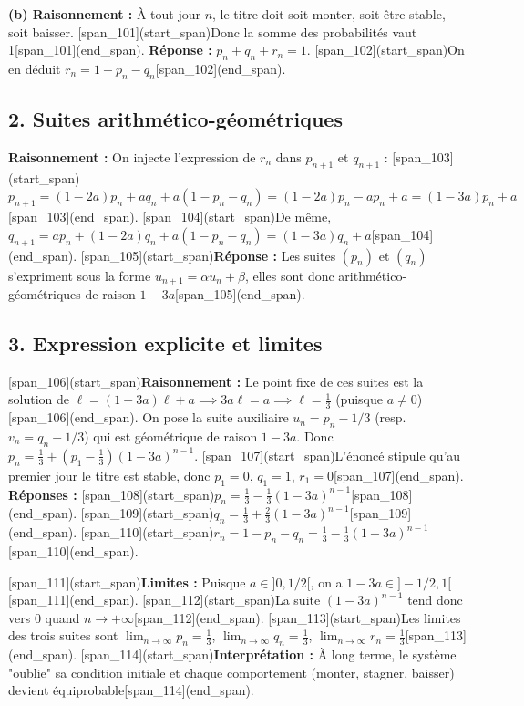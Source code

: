 \documentclass[11pt,a4paper]{article}
\begin{document}
\textbf{(b) Raisonnement :} À tout jour $n$, le titre doit soit monter, soit être stable, soit baisser. [span_101](start_span)Donc la somme des probabilités vaut 1[span_101](end_span).
\textbf{Réponse :} $p_n + q_n + r_n = 1$. [span_102](start_span)On en déduit $r_n = 1 - p_n - q_n$[span_102](end_span).

\subsection*{2. Suites arithmético-géométriques}
\textbf{Raisonnement :} On injecte l'expression de $r_n$ dans $p_{n+1}$ et $q_{n+1}$ :
[span_103](start_span)$p_{n+1} = (1-2a)p_n + a q_n + a(1 - p_n - q_n) = (1-2a)p_n - a p_n + a = (1-3a)p_n + a$[span_103](end_span).
[span_104](start_span)De même, $q_{n+1} = a p_n + (1-2a)q_n + a(1 - p_n - q_n) = (1-3a)q_n + a$[span_104](end_span).
[span_105](start_span)\textbf{Réponse :} Les suites $(p_n)$ et $(q_n)$ s'expriment sous la forme $u_{n+1} = \alpha u_n + \beta$, elles sont donc arithmético-géométriques de raison $1-3a$[span_105](end_span).

\subsection*{3. Expression explicite et limites}
[span_106](start_span)\textbf{Raisonnement :} Le point fixe de ces suites est la solution de $\ell = (1-3a)\ell + a \implies 3a\ell = a \implies \ell = \frac{1}{3}$ (puisque $a \neq 0$)[span_106](end_span).
On pose la suite auxiliaire $u_n = p_n - 1/3$ (resp. $v_n = q_n - 1/3$) qui est géométrique de raison $1-3a$. 
Donc $p_n = \frac{1}{3} + (p_1 - \frac{1}{3})(1-3a)^{n-1}$.
[span_107](start_span)L'énoncé stipule qu'au premier jour le titre est stable, donc $p_1 = 0$, $q_1 = 1$, $r_1 = 0$[span_107](end_span).
\textbf{Réponses :}
[span_108](start_span)$p_n = \frac{1}{3} - \frac{1}{3}(1-3a)^{n-1}$[span_108](end_span).
[span_109](start_span)$q_n = \frac{1}{3} + \frac{2}{3}(1-3a)^{n-1}$[span_109](end_span).
[span_110](start_span)$r_n = 1 - p_n - q_n = \frac{1}{3} - \frac{1}{3}(1-3a)^{n-1}$[span_110](end_span).

[span_111](start_span)\textbf{Limites :} Puisque $a \in ]0, 1/2[$, on a $1-3a \in ]-1/2, 1[$[span_111](end_span). [span_112](start_span)La suite $(1-3a)^{n-1}$ tend donc vers 0 quand $n \to +\infty$[span_112](end_span).
[span_113](start_span)Les limites des trois suites sont $\lim_{n \to \infty} p_n = \frac{1}{3}$, $\lim_{n \to \infty} q_n = \frac{1}{3}$, $\lim_{n \to \infty} r_n = \frac{1}{3}$[span_113](end_span).
[span_114](start_span)\textbf{Interprétation :} À long terme, le système "oublie" sa condition initiale et chaque comportement (monter, stagner, baisser) devient équiprobable[span_114](end_span).
\end{document}
